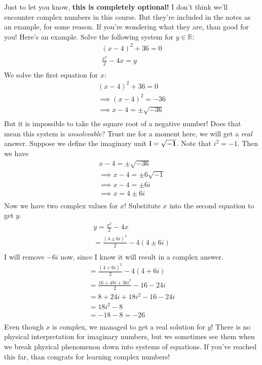 \myremark
{
	Just to let you know, {\bf this is completely optional!} I don't think we'll encounter complex numbers in this course. But they're included in the notes as an example, for some reason. If you're wondering what they are, than good for you! Here's an example. Solve the following system for $y \in \mathbb{R}$:
	\begin{align*}
		(x-4)^2+36=0\\
		\frac{x^2}{2}-4x=y\\
	\end{align*}
	We solve the first equation for $x$:
	\begin{align*}
		(x-4)^2+36=0\\
		\implies (x-4)^2=-36\\
		\implies x-4=\pm\sqrt{-36}\\
	\end{align*}
	But it is impossible to take the square root of a negative number! Does that mean this system is \emph{unsolveable}? Trust me for a moment here, we will get a \emph{real} answer. Suppose we define the imaginary unit $\bf{i} = \sqrt{-1}$. Note that $i^2=-1$. Then we have
	\begin{align*}
		x-4=\pm\sqrt{-36}\\
		\implies x-4=\pm6\sqrt{-1}\\
		\implies x-4=\pm6i\\
		\implies x=4\pm6i\\
	\end{align*}
	Now we have two complex values for $x$! Substitute $x$ into the second equation to get $y$.
	\begin{align*}
		y=\frac{x^2}{2}-4x\\
		=\frac{(4\pm6i)^2}{2}-4(4\pm6i)\\
	\end{align*}
	I will remove $-6i$ now, since I know it will result in a complex answer.
	\begin{align*}
		=\frac{(4+6i)^2}{2}-4(4+6i)\\
		=\frac{16+48i+36i^2}{2}-16-24i\\
		=8+24i+18i^2-16-24i\\
		=18i^2-8\\
		=-18-8=-26\\
	\end{align*}
	Even though $x$ is complex, we managed to get a real solution for $y$! There is no physical interpretation for imaginary numbers, but we sometimes see them when we break physical phenomenon down into systems of equations. If you've reached this far, than congrats for learning complex numbers!
}

